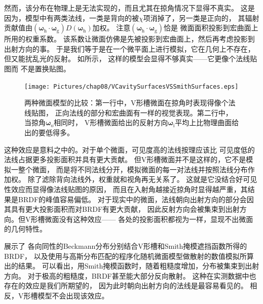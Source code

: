 然而，该分布在物理上是无法实现的，而且尤其在掠角情况下显得不真实。
这是因为，模型中有两类法线，一类是背向的被$\chi$项消掉了，另一类是正向的，
其辐射贡献值由$({\bm\omega}_{\mathrm{h}}\cdot{\bm\omega}_{\mathrm{g}})D({\bm\omega}_{\mathrm{h}})$加权。
注意$({\bm\omega}_{\mathrm{h}}\cdot{\bm\omega}_{\mathrm{g}})$恰是
微面面积投影到宏曲面上所用的权重系数。
该系数让微面仿佛是先被投影到宏曲面上，然后再考虑投影到出射方向的事。
于是我们等于是在一个微平面上进行模拟，它在几何上不存在，但又能扰乱光的反射。
如所示，
这样的模型会显得不够真实——它更像个法线贴图而
不是置换贴图。
\begin{figure}[htbp]
    \centering
    \texttt{[image: Pictures/chap08/VCavitySurfacesVSSmithSurfaces.eps]}
    \caption{两种微面模型的比较：第一行中，V形槽微面在掠角时表现得像个法线贴图，
        正向法线的部分和宏曲面有一样的视觉表现。第二行中，当掠角${\bm\omega}_{\mathrm{o}}$相同时，
        V形槽微面给出的反射方向${\bm\omega}_{\mathrm{i}}$平均上比物理曲面给出的要低得多。}
    \label{fig:08ex01-VCavitySurfacesVSSmithSurfaces}
\end{figure}

这种效应是意料之中的。对于单个微面，可见度高的法线按理应该比
可见度低的法线占据更多投影面积并具有更大贡献。
但V形槽微面并不是这样的，它不是模拟一整个微面，
而是将不同法线分开，模拟微面的每一对法线并按照法线分布作加权。
除了滤除背向法线外，权重就和视角再无关系了。
这就是它没结合好可见性效应而显得像法线贴图的原因，
而且在入射角越接近掠角时显得越严重，其结果是BRDF的峰值容易偏低。
对于现实中的微面，法线朝向出射方向的部分会因其具有更大投影面积而对BRDF有更大贡献，
因此反射方向会被集束到出射方向。但V形槽微面没有这种效应——
各处的投影面积都视为一样，显现不出微面的几何特性。

展示了
各向同性的Beckmann分布分别结合V形槽和Smith掩模遮挡函数所得的BRDF，
以及使用与高斯分布匹配的程序化随机微面模型做散射的数值模拟所算出的结果。
可以看出，用Smith掩模函数时，随着粗糙度增加，分布被集束到出射方向。
对于极高的粗糙度，BRDF甚至能大部分反向散射。
这种在实测数据中也存在的效应是我们所期望的，
因为此时朝向出射方向的法线是最容易看见的。
相反，V形槽模型不会出现该效应。

